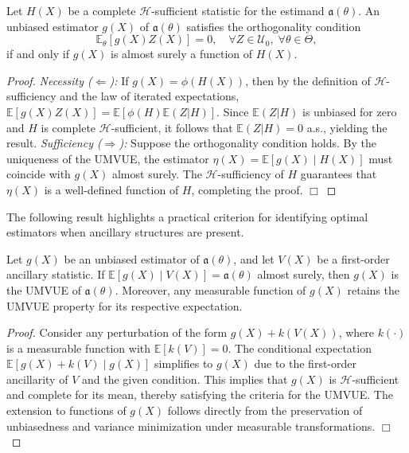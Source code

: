 \documentclass[twoside]{article}
\begin{document}
\begin{thm}\label{thm:H_orth}
Let $H(X)$ be a complete $\mathscr{H}$-sufficient statistic for the estimand $\mathfrak{a}(\theta)$. An unbiased estimator $g(X)$ of $\mathfrak{a}(\theta)$ satisfies the orthogonality condition
\begin{equation}
    \mathbb{E}_{\theta}[g(X)Z(X)] = 0, \quad \forall Z \in \mathcal{U}_0, \; \forall \theta \in \Theta,
\end{equation}
if and only if $g(X)$ is almost surely a function of $H(X)$.
\end{thm}
\begin{proof}
\textit{Necessity ($\Longleftarrow$):} If $g(X) = \phi(H(X))$, then by the definition of $\mathscr{H}$-sufficiency and the law of iterated expectations, $\mathbb{E}[g(X)Z(X)] = \mathbb{E}[\phi(H) \mathbb{E}(Z|H)]$. Since $\mathbb{E}(Z|H)$ is unbiased for zero and $H$ is complete $\mathscr{H}$-sufficient, it follows that $\mathbb{E}(Z|H) = 0$ a.s., yielding the result.
\textit{Sufficiency ($\Longrightarrow$):} Suppose the orthogonality condition holds. By the uniqueness of the UMVUE, the estimator $\eta(X) = \mathbb{E}[g(X) \mid H(X)]$ must coincide with $g(X)$ almost surely. The $\mathscr{H}$-sufficiency of $H$ guarantees that $\eta(X)$ is a well-defined function of $H$, completing the proof. \hfill $\Box$
\end{proof}

The following result highlights a practical criterion for identifying optimal estimators when ancillary structures are present.

\begin{thm}\label{thm:anc_cond}
Let $g(X)$ be an unbiased estimator of $\mathfrak{a}(\theta)$, and let $V(X)$ be a first-order ancillary statistic. If $\mathbb{E}[g(X) \mid V(X)] = \mathfrak{a}(\theta)$ almost surely, then $g(X)$ is the UMVUE of $\mathfrak{a}(\theta)$. Moreover, any measurable function of $g(X)$ retains the UMVUE property for its respective expectation.
\end{thm}
\begin{proof}
Consider any perturbation of the form $g(X) + k(V(X))$, where $k(\cdot)$ is a measurable function with $\mathbb{E}[k(V)] = 0$. The conditional expectation $\mathbb{E}[g(X) + k(V) \mid g(X)]$ simplifies to $g(X)$ due to the first-order ancillarity of $V$ and the given condition. This implies that $g(X)$ is $\mathscr{H}$-sufficient and complete for its mean, thereby satisfying the criteria for the UMVUE. The extension to functions of $g(X)$ follows directly from the preservation of unbiasedness and variance minimization under measurable transformations. \hfill $\Box$
\end{proof}
\end{document}
